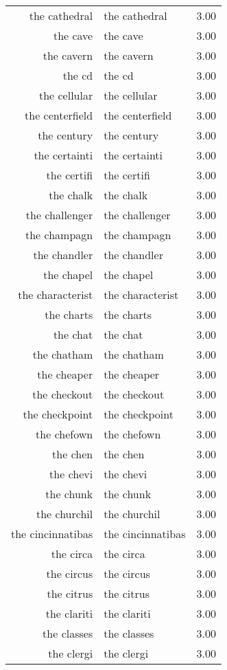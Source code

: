 \begin{table}[ht]
\begin{tabular}{rlr}
  the cathedral & the cathedral & 3.00 \\ 
  the cave & the cave & 3.00 \\ 
  the cavern & the cavern & 3.00 \\ 
  the cd & the cd & 3.00 \\ 
  the cellular & the cellular & 3.00 \\ 
  the centerfield & the centerfield & 3.00 \\ 
  the century & the century & 3.00 \\ 
  the certainti & the certainti & 3.00 \\ 
  the certifi & the certifi & 3.00 \\ 
  the chalk & the chalk & 3.00 \\ 
  the challenger & the challenger & 3.00 \\ 
  the champagn & the champagn & 3.00 \\ 
  the chandler & the chandler & 3.00 \\ 
  the chapel & the chapel & 3.00 \\ 
  the characterist & the characterist & 3.00 \\ 
  the charts & the charts & 3.00 \\ 
  the chat & the chat & 3.00 \\ 
  the chatham & the chatham & 3.00 \\ 
  the cheaper & the cheaper & 3.00 \\ 
  the checkout & the checkout & 3.00 \\ 
  the checkpoint & the checkpoint & 3.00 \\ 
  the chefown & the chefown & 3.00 \\ 
  the chen & the chen & 3.00 \\ 
  the chevi & the chevi & 3.00 \\ 
  the chunk & the chunk & 3.00 \\ 
  the churchil & the churchil & 3.00 \\ 
  the cincinnatibas & the cincinnatibas & 3.00 \\ 
  the circa & the circa & 3.00 \\ 
  the circus & the circus & 3.00 \\ 
  the citrus & the citrus & 3.00 \\ 
  the clariti & the clariti & 3.00 \\ 
  the classes & the classes & 3.00 \\ 
  the clergi & the clergi & 3.00 \\ 

\end{tabular}
\end{table}
